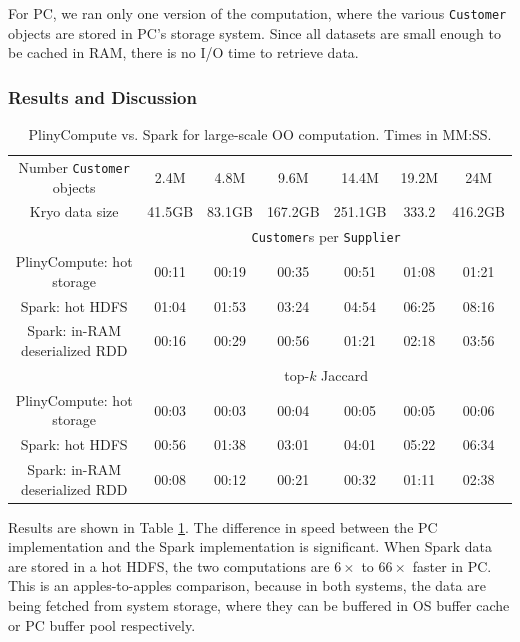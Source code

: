 For PC, we ran only one version of the computation, where the various \texttt{Customer} objects are stored in
PC's storage system.  Since all datasets are small enough to be cached in RAM, there is no I/O time to
retrieve data.

\subsubsection{Results and Discussion}

\begin{table}[h!]
\begin{center}
\begin{tabular}{|c||c|c|c|c|c|c|}
\hline
Number \texttt{Customer} objects &2.4M & 4.8M & 9.6M  & 14.4M & 19.2M & 24M \\
Kryo data size &41.5GB & 83.1GB & 167.2GB &251.1GB &333.2 &416.2GB \\
\hline
& \multicolumn{6}{c|}{\texttt{Customer}s per \texttt{Supplier}} \\
\hline
PlinyCompute: hot storage & 00:11&	00:19&	00:35&	00:51&	01:08&	01:21 \\
Spark: hot HDFS & 01:04&	01:53&	03:24&	04:54&	06:25&	08:16\\
Spark: in-RAM deserialized RDD & 00:16& 	00:29& 	00:56& 	01:21& 	02:18& 	03:56\\
\hline
& \multicolumn{6}{c|}{top-$k$ Jaccard} \\
\hline
PlinyCompute: hot storage & 00:03&	00:03&	00:04&	00:05&	00:05&	00:06 \\
Spark: hot HDFS & 00:56&	01:38&	03:01 & 04:01&	05:22&	06:34\\
Spark: in-RAM deserialized RDD & 00:08& 	00:12& 	00:21 & 00:32& 	01:11& 	02:38\\
\hline
\end{tabular}
\caption{PlinyCompute vs. Spark for large-scale OO computation. Times in MM:SS.}
\label{fig:TPC}
\end{center}
\end{table}

Results are shown in Table \ref{fig:TPC}.  The difference in speed between the PC implementation and the Spark implementation
is significant.
When Spark data
are stored in
a hot HDFS, the two computations are $6\times$ to $66\times$ faster in PC.  
This is an apples-to-apples comparison, because in both systems, the data are being fetched from system storage, where they
can be buffered in OS buffer cache or PC buffer pool respectively.

